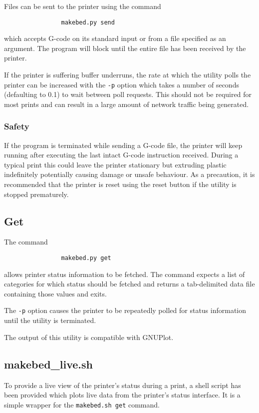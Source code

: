 			Files can be sent to the printer using the command
			\begin{verbatim}
				makebed.py send
			\end{verbatim}
			which accepts G-code on its standard input or from a file specified as an
			argument. The program will block until the entire file has been received
			by the printer.
			
			If the printer is suffering buffer underruns, the rate at which the
			utility polls the printer can be increased with the \verb|-p| option which
			takes a number of seconds (defaulting to 0.1) to wait between poll
			requests. This should not be required for most prints and can result in a
			large amount of network traffic being generated.
			
			\subsubsection{Safety}
				
				If the program is terminated while sending a G-code file, the printer
				will keep running after executing the last intact G-code instruction
				received. During a typical print this could leave the printer stationary
				but extruding plastic indefinitely potentially causing damage or unsafe
				behaviour. As a precaution, it is recommended that the printer is reset
				using the reset button if the utility is stopped prematurely.
		
		\subsection{Get}
			
			The command
			\begin{verbatim}
				makebed.py get
			\end{verbatim}
			allows printer status information to be fetched. The command expects a
			list of categories for which status should be fetched and returns a
			tab-delimited data file containing those values and exits.
			
			The \verb|-p| option causes the printer to be repeatedly polled for status
			information until the utility is terminated.
			
			The output of this utility is compatible with GNUPlot.
		
		\subsection{makebed\_live.sh}
			
			\label{sec:makebedliveDoc}
			
			To provide a live view of the printer's status during a print, a shell
			script has been provided which plots live data from the printer's status
			interface. It is a simple wrapper for the \verb|makebed.sh get| command.
